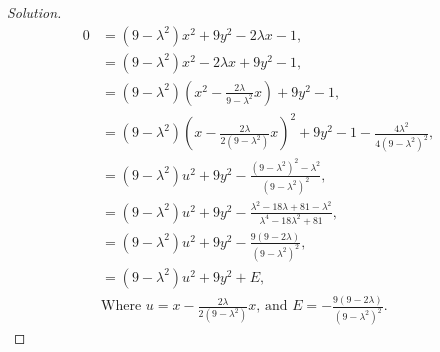 \documentclass[letterpaper, 12pt]{amsart}
\theoremstyle{definition}  							%
\begin{document}
\begin{proof}[Solution]
			\begin{align*}
				0 &= \left( 9 - \lambda^2 \right)x^{2} + 9y^2 - 2\lambda x - 1, \\
				&= \left( 9 - \lambda^2 \right)x^{2} - 2\lambda x + 9y^2  - 1, \\
				&= \left( 9 - \lambda^2 \right)\left(x^2 - \tfrac{2\lambda}{9 - \lambda^2}x \right) + 9y^2 - 1, \\
				&= \left( 9 - \lambda^2 \right)\left(x - \tfrac{2\lambda}{2\left(9 - \lambda^2\right)}x \right)^{2} + 9y^2 - 1 - \tfrac{4\lambda^2}{4(9 - \lambda^2)^2}, \\
				&= \left( 9 - \lambda^2 \right)u^{2} + 9y^2 - \tfrac{(9 - \lambda^2)^2 - \lambda^2}{(9 - \lambda^2)^2}, \\
				&= \left( 9 - \lambda^2 \right)u^{2} + 9y^2 - \tfrac{\lambda^2 - 18\lambda + 81 - \lambda^2}{\lambda^4 - 18\lambda^2 + 81}, \\
				&= \left( 9 - \lambda^2 \right)u^{2} + 9y^2 - \tfrac{9(9 - 2\lambda)}{(9 - \lambda^2)^2}, \\
				&= \left( 9 - \lambda^2 \right)u^{2} + 9y^2 + E, \\
				& \text{Where $u = x - \tfrac{2\lambda}{2\left(9 - \lambda^2\right)}x$, and $E = - \tfrac{9(9 - 2\lambda)}{(9 - \lambda^2)^2}$.}
			\end{align*}


\end{proof}
\end{document}
